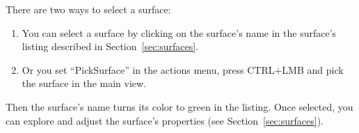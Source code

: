 There are two ways to select a surface:

\begin{enumerate}
	\item You can select a surface by clicking on the surface's name in the surface's listing described in Section~\ref{sec:surfaces}.
	\item Or you set ``PickSurface'' in the actions menu, press CTRL+LMB and pick the surface in the main view.
\end{enumerate}
Then the surface's name turns its color to green in the listing. Once selected, you can explore and adjust the surface's properties (see Section~\ref{sec:surfaces}).




